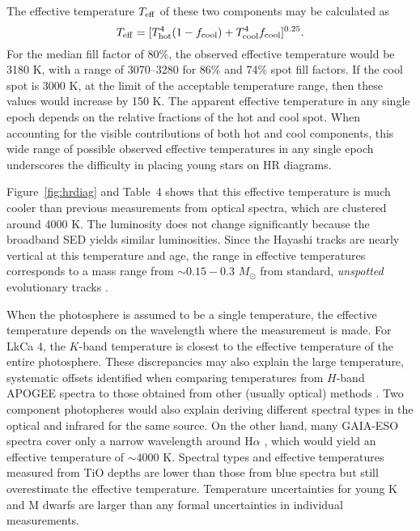 \documentclass[twocolumn]{emulateapj}%
\begin{document}
The effective temperature $T_{\rm eff}$ of these two components may be calculated as
\begin{equation}
T_{\rm eff}=[T_{\rm hot}^4(1-f_{\mathrm{cool}})+T_{\mathrm{cool}}^4 f_{\mathrm{cool}}]^{0.25}.
\end{equation}
For the median fill factor of 80\%, the observed effective temperature would be 3180 K, with a range of 3070--3280 for 86\% and 74\% spot fill factors.  If the cool spot is 3000 K, at the limit of the acceptable temperature range, then these values would increase by 150 K.  The apparent effective temperature in any single epoch depends on the relative fractions of the hot and cool spot.  When accounting for the visible contributions of both hot and cool components, this wide range of possible observed effective temperatures in any single epoch underscores the difficulty in placing young stars on HR diagrams.  

Figure~\ref{fig:hrdiag} and Table~4 shows that this effective temperature is much cooler than previous measurements from optical spectra, which are clustered around 4000 K.  The luminosity does not change significantly because the broadband SED yields similar luminosities.
Since the Hayashi tracks are nearly vertical at this temperature and age, the range in effective temperatures corresponds to a mass range from $\sim 0.15-0.3$ $M_\odot$ from standard, \emph{unspotted} evolutionary tracks \citep{baraffe15}.

When the photosphere is assumed to be a single temperature, the effective temperature depends on the wavelength where the measurement is made.  For LkCa 4, the $K$-band temperature  is closest to the effective temperature of the entire photosphere.  These discrepancies may also explain the large temperature, systematic offsets identified when comparing temperatures from $H$-band APOGEE spectra to those obtained from other (usually optical) methods \citep{cottaar14}.  Two component photopheres would also explain deriving different spectral types in the optical and infrared for the same source.
On the other hand, many GAIA-ESO spectra cover only a narrow wavelength around H$\alpha$ \citep[e.g.][]{jeffries14,frasca15}, which would yield an effective temperature of $\sim 4000$ K.   Spectral types and effective temperatures measured from TiO depths \citep{herczeg14} are lower than those from blue spectra but still overestimate the effective temperature.  Temperature uncertainties for young K and M dwarfs are larger than any formal uncertainties in individual measurements.
\end{document}
